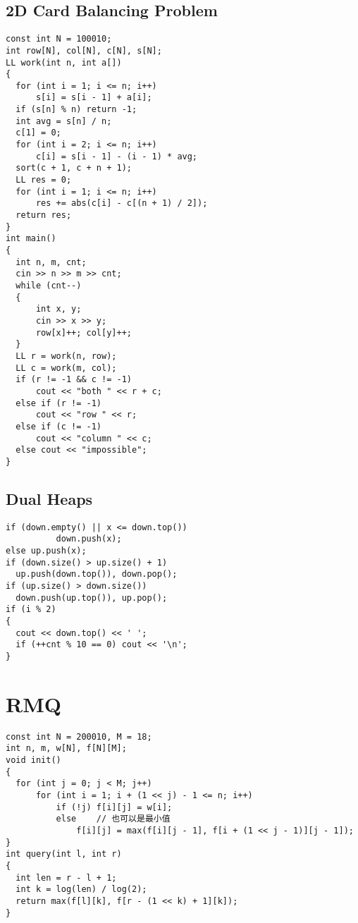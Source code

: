 \subsection{2D Card Balancing Problem}
\begin{lstlisting}
const int N = 100010;
int row[N], col[N], c[N], s[N];
LL work(int n, int a[])
{
  for (int i = 1; i <= n; i++)
      s[i] = s[i - 1] + a[i];
  if (s[n] % n) return -1;
  int avg = s[n] / n;
  c[1] = 0;
  for (int i = 2; i <= n; i++)
      c[i] = s[i - 1] - (i - 1) * avg;
  sort(c + 1, c + n + 1);
  LL res = 0;
  for (int i = 1; i <= n; i++)
      res += abs(c[i] - c[(n + 1) / 2]);
  return res;
}
int main()
{
  int n, m, cnt;
  cin >> n >> m >> cnt;
  while (cnt--)
  {
      int x, y;
      cin >> x >> y;
      row[x]++; col[y]++;
  }
  LL r = work(n, row);
  LL c = work(m, col);
  if (r != -1 && c != -1)
      cout << "both " << r + c;
  else if (r != -1)
      cout << "row " << r;
  else if (c != -1)
      cout << "column " << c;
  else cout << "impossible";
}
\end{lstlisting}
\subsection{Dual Heaps}
\begin{lstlisting}
if (down.empty() || x <= down.top())
          down.push(x);
else up.push(x);
if (down.size() > up.size() + 1)
  up.push(down.top()), down.pop();
if (up.size() > down.size())
  down.push(up.top()), up.pop();
if (i % 2)
{
  cout << down.top() << ' ';
  if (++cnt % 10 == 0) cout << '\n';
}
\end{lstlisting}
\section{RMQ}
\begin{lstlisting}
const int N = 200010, M = 18;
int n, m, w[N], f[N][M];
void init()
{
  for (int j = 0; j < M; j++)
      for (int i = 1; i + (1 << j) - 1 <= n; i++)
          if (!j) f[i][j] = w[i];
          else    // 也可以是最小值
              f[i][j] = max(f[i][j - 1], f[i + (1 << j - 1)][j - 1]);
}
int query(int l, int r)
{
  int len = r - l + 1;
  int k = log(len) / log(2);
  return max(f[l][k], f[r - (1 << k) + 1][k]);
}
\end{lstlisting}
